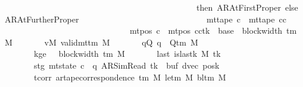 \begin{isabellebody}
\ \ \ \ \ \ \ \ \ \ \ \ \ \ \ \ \ \ \ \ \ \ \ \ \ \ \ \ \ \ \ \ \ \ \ \ \ \ \ \ \ \ \ \ \ \ then\ AR{\isacharunderscore}{\kern0pt}AtFirstProper\ else\ AR{\isacharunderscore}{\kern0pt}AtFurtherProper{\isacharparenright}{\kern0pt}{\isacharparenright}{\kern0pt}\isanewline
\ \ \ \ \ \ \ \ \ \ \ \ \ \ \ \ \ \ \ \ \ \ \ \ \ \ \ \ \ {\isasymand}\ mt{\isacharunderscore}{\kern0pt}tape\ c{\isacharprime}{\kern0pt}{\isacharprime}{\kern0pt}\ {\isacharequal}{\kern0pt}\ mt{\isacharunderscore}{\kern0pt}tape\ cc\isanewline
\ \ \ \ \ \ \ \ \ \ \ \ \ \ \ \ \ \ \ \ \ \ \ \ \ \ \ \ \ {\isasymand}\ mt{\isacharunderscore}{\kern0pt}pos\ c{\isacharprime}{\kern0pt}{\isacharprime}{\kern0pt}\ {\isacharequal}{\kern0pt}\ {\isacharparenleft}{\kern0pt}mt{\isacharunderscore}{\kern0pt}pos\ cc{\isacharparenright}{\kern0pt}{\isacharparenleft}{\kern0pt}tk\ {\isacharcolon}{\kern0pt}{\isacharequal}{\kern0pt}\ base{\isacharprime}{\kern0pt}\ {\isacharplus}{\kern0pt}\ block{\isacharunderscore}{\kern0pt}width\ {\isacharparenleft}{\kern0pt}{\isasymGamma}{\isacharunderscore}{\kern0pt}tm\ M{\isacharparenright}{\kern0pt}{\isacharparenright}{\kern0pt}{\isachardoublequoteclose}\isanewline
\ \ \ \ \ \ \ vM{\isacharcolon}{\kern0pt}\ {\isachardoublequoteopen}valid{\isacharunderscore}{\kern0pt}mttm\ M{\isachardoublequoteclose}\isanewline
\ \ \ \ \ \ \ qQ{\isacharcolon}{\kern0pt}\ {\isachardoublequoteopen}q\ {\isasymin}\ Q{\isacharunderscore}{\kern0pt}tm\ M{\isachardoublequoteclose}\isanewline
\ \ \ \ \ \ \ kge{}{\isacharcolon}{\kern0pt}\ {\isachardoublequoteopen}{}\ {\isasymle}\ block{\isacharunderscore}{\kern0pt}width\ {\isacharparenleft}{\kern0pt}{\isasymGamma}{\isacharunderscore}{\kern0pt}tm\ M{\isacharparenright}{\kern0pt}{\isachardoublequoteclose}\isanewline
\ \ \ \ \ \ \ last{\isacharcolon}{\kern0pt}\ {\isachardoublequoteopen}is{\isacharunderscore}{\kern0pt}last{\isacharunderscore}{\kern0pt}k\ M\ tk{\isachardoublequoteclose}\isanewline
\ \ \ \ \ \ \ stg{\isacharcolon}{\kern0pt}\ {\isachardoublequoteopen}mt{\isacharunderscore}{\kern0pt}state\ c{\isacharprime}{\kern0pt}\ {\isacharequal}{\kern0pt}\ {\isacharparenleft}{\kern0pt}q{\isacharcomma}{\kern0pt}\ AR{\isacharunderscore}{\kern0pt}SimRead{\isacharcomma}{\kern0pt}\ tk{\isacharcomma}{\kern0pt}\ {}{\isacharcomma}{\kern0pt}\ buf{\isacharcomma}{\kern0pt}\ dvec{\isacharcomma}{\kern0pt}\ posk{\isacharparenright}{\kern0pt}{\isachardoublequoteclose}\isanewline
\ \ \ \ \ \ \ tcorr{\isacharcolon}{\kern0pt}\ {\isachardoublequoteopen}ar{\isacharunderscore}{\kern0pt}tape{\isacharunderscore}{\kern0pt}correspondence\ {\isacharparenleft}{\kern0pt}{\isasymGamma}{\isacharunderscore}{\kern0pt}tm\ M{\isacharparenright}{\kern0pt}\ {\isacharparenleft}{\kern0pt}le{\isacharunderscore}{\kern0pt}tm\ M{\isacharparenright}{\kern0pt}\ {\isacharparenleft}{\kern0pt}bl{\isacharunderscore}{\kern0pt}tm\ M{\isacharparenright}{\kern0pt}\isanewline

\end{isabellebody}
